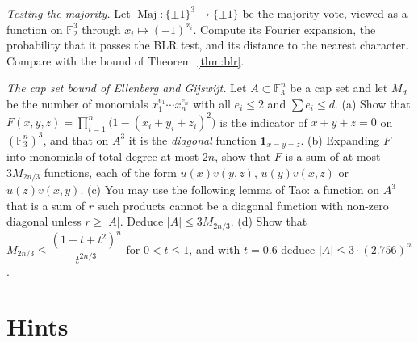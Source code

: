 \begin{exercise}[$\star$]\label{ex:majority}
\emph{Testing the majority.} Let $\operatorname{Maj}:\{\pm1\}^3\to\{\pm1\}$ be the majority vote, viewed as a function on $\mathbb F_2^3$ through
$x_i\mapsto(-1)^{x_i}$. Compute its Fourier expansion, the probability that it passes the BLR test, and its distance to the nearest
character. Compare with the bound of Theorem~\ref{thm:blr}.
\end{exercise}

\begin{exercise}[$\star\star\star$]\label{ex:capset}
\emph{The cap set bound of Ellenberg and Gijswijt.} Let $A\subset\mathbb F_3^n$ be a cap set and let $M_d$ be the number of monomials
$x_1^{e_1}\cdots x_n^{e_n}$ with all $e_i\le2$ and $\sum e_i\le d$. (a) Show that $F(x,y,z)=\prod_{i=1}^n\bigl(1-(x_i+y_i+z_i)^2\bigr)$ is the indicator of
$x+y+z=0$ on $(\mathbb F_3^n)^3$, and that on $A^3$ it is the \emph{diagonal} function $\mathbf 1_{x=y=z}$. (b) Expanding $F$ into monomials of total degree at most
$2n$, show that $F$ is a sum of at most $3M_{2n/3}$ functions, each of the form $u(x)v(y,z)$, $u(y)v(x,z)$ or $u(z)v(x,y)$. (c) You may use the
following lemma of Tao: a function on $A^3$ that is a sum of $r$ such products cannot be a diagonal function with non-zero diagonal unless
$r\ge|A|$. Deduce $|A|\le3M_{2n/3}$. (d) Show that $M_{2n/3}\le\dfrac{(1+t+t^2)^n}{t^{2n/3}}$ for $0<t\le1$, and with $t=0.6$ deduce $|A|\le3\cdot(2.756)^n$.
\end{exercise}

\section{Hints}


